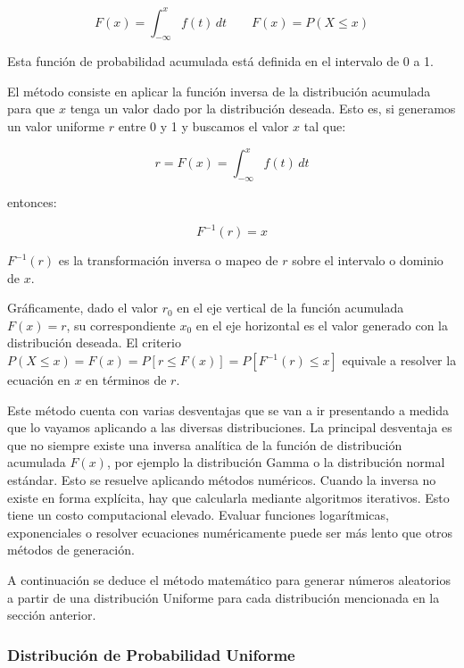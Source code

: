 \documentclass{article}
\begin{document}
\begin{equation}
    F(x) = \int_{-\infty}^{x} f(t)\, dt \qquad F(x) = P(X \leq x)
\end{equation}

Esta función de probabilidad acumulada está definida en el intervalo de 0 a 1.

El método consiste en aplicar la función inversa de la distribución acumulada para que $x$
tenga un valor dado por la distribución deseada. Esto es, si generamos un valor uniforme
$r$ entre 0 y 1 y buscamos el valor $x$ tal que:

\begin{equation}
    r = F(x) = \int_{-\infty}^{x} f(t)\, dt
\end{equation}

entonces:

\begin{equation}
    F^{-1}(r) = x
\end{equation}

$F^{-1}(r)$ es la transformación inversa o mapeo de $r$ sobre el intervalo o dominio de $x$.

Gráficamente, dado el valor $r_0$ en el eje vertical de la función acumulada $F(x) = r$, su
correspondiente $x_0$ en el eje horizontal es el valor generado con la distribución deseada.
El criterio $P(X \leq x) = F(x) = P[r \leq F(x)] = P[F^{-1}(r) \leq x]$ equivale a resolver la
ecuación en $x$ en términos de $r$.

Este método cuenta con varias desventajas que se van a ir presentando a medida que lo
vayamos aplicando a las diversas distribuciones. La principal desventaja es que no siempre
existe una inversa analítica de la función de distribución acumulada $F(x)$, por ejemplo la
distribución Gamma o la distribución normal estándar. Esto se resuelve aplicando métodos
numéricos. Cuando la inversa no existe en forma explícita, hay que calcularla mediante
algoritmos iterativos. Esto tiene un costo computacional elevado. Evaluar funciones
logarítmicas, exponenciales o resolver ecuaciones numéricamente puede ser más lento que
otros métodos de generación.

A continuación se deduce el método matemático para generar números aleatorios a partir de
una distribución Uniforme para cada distribución mencionada en la sección anterior.


\subsubsection{Distribución de Probabilidad Uniforme}
\end{document}
